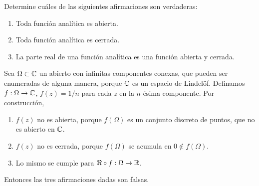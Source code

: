 \begin{exercise}
Determine cuáles de las siguientes afirmaciones son verdaderas:
\begin{enumerate}[label=(\alph*)]
    \item Toda función analítica es abierta.
    \item Toda función analítica es cerrada.
    \item La parte real de una función analítica es una función abierta y cerrada.
\end{enumerate}
\end{exercise}

\begin{solution}
Sea $\Omega \subset \mathbb C$ un abierto con infinitas componentes conexas, que pueden ser enumeradas de alguna manera, porque $\mathbb C$ es un espacio de Lindelöf. Definamos $f : \Omega \to \mathbb C$, $f(z) = 1/n$ para cada $z$ en la $n$-ésima componente. Por construcción,
\begin{enumerate}[label=(\alph*)]
    \item $f(z)$ no es abierta, porque $f(\Omega)$ es un conjunto discreto de puntos, que no es abierto en $\mathbb C$.
    \item $f(z)$ no es cerrada, porque $f(\Omega)$ se acumula en $0 \notin f(\Omega)$.
    \item Lo mismo se cumple para $\Re \circ f : \Omega \to \mathbb R$.
\end{enumerate}
Entonces las tres afirmaciones dadas son falsas.
\end{solution}
